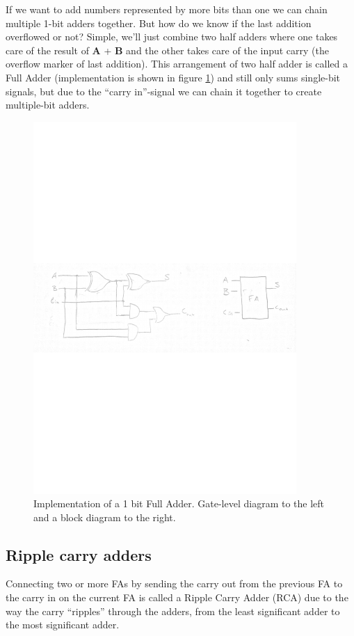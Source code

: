 \documentclass[a4paper,11pt]{report}
\begin{document}
If we want to add numbers represented by more bits than one we can
chain multiple 1-bit adders together. But how do we know if the last
addition overflowed or not? Simple, we'll just combine two half adders
where one takes care of the result of \textbf{A} + \textbf{B} and the
other takes care of the input carry (the overflow marker of last
addition).  This arrangement of two half adder is called a Full Adder
(implementation is shown in figure \ref{fig:fa}) and still only sums
single-bit signals, but due to the ``carry in''-signal we can chain it
together to create multiple-bit adders.

\begin{figure}[H]
  \centering
  \includegraphics[width=10cm]{images/FA.pdf}
  \caption{Implementation of a 1 bit Full Adder. Gate-level diagram to the left and a block diagram to the right.}
  \label{fig:fa}
\end{figure}

\subsection{Ripple carry adders}

Connecting two or more FAs by sending the carry out from the previous
FA to the carry in on the current FA is called a Ripple Carry Adder
(RCA) due to the way the carry ``ripples'' through the adders, from
the least significant adder to the most significant adder.
\end{document}
